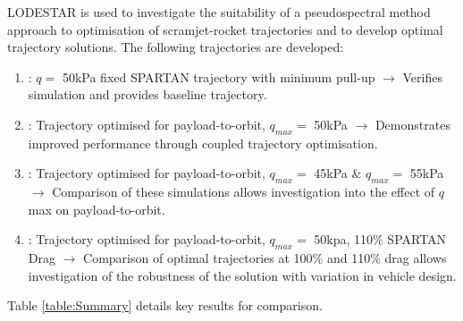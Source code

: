 \documentclass[journal]{new-aiaa}
\begin{document}
LODESTAR is used to investigate the suitability of a pseudospectral method approach to optimisation of scramjet-rocket trajectories and to develop optimal trajectory solutions. The following trajectories are developed: 
\begin{enumerate}
	\item: $q = $ 50kPa fixed SPARTAN trajectory with minimum pull-up \newline$\rightarrow$ Verifies simulation and provides baseline trajectory.
	\item: Trajectory optimised for payload-to-orbit, $q_{max} = $ 50kPa \newline$\rightarrow$ Demonstrates improved performance through coupled trajectory optimisation.
	\item: Trajectory optimised for payload-to-orbit, $q_{max} = $ 45kPa \& $q_{max} = $ 55kPa \newline$\rightarrow$ Comparison of these simulations allows investigation into the effect of $q$ max on payload-to-orbit.
	\item: Trajectory optimised for payload-to-orbit,  $q_{max} = $ 50kpa, 110\% SPARTAN Drag \newline$\rightarrow$ Comparison of optimal trajectories at 100\% and 110\% drag allows investigation of the robustness of the solution with variation in vehicle design. 
\end{enumerate}

Table \ref{table:Summary} details key results for comparison. 
\end{document}

